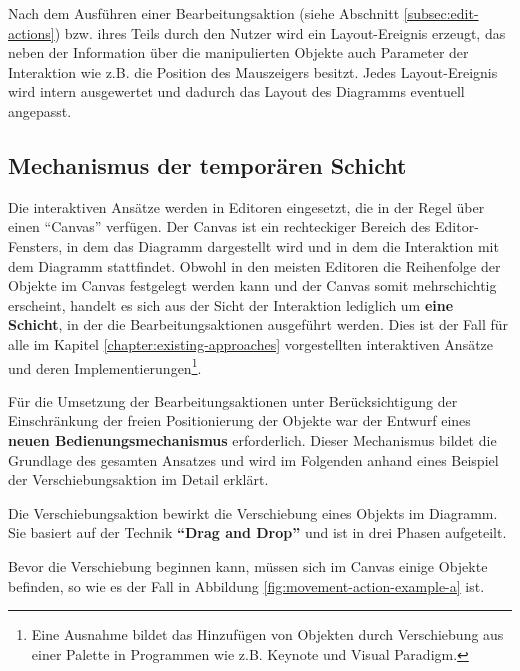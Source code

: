 Nach dem Ausführen einer Bearbeitungsaktion (siehe Abschnitt \ref{subsec:edit-actions}) bzw. ihres Teils durch den Nutzer wird ein Layout-Ereignis erzeugt, das neben der Information über die manipulierten Objekte auch Parameter der Interaktion wie z.B. die Position des Mauszeigers besitzt. Jedes Layout-Ereignis wird intern ausgewertet und dadurch das Layout des Diagramms eventuell angepasst.

\subsection{Mechanismus der temporären Schicht}

Die interaktiven Ansätze werden in Editoren eingesetzt, die in der Regel über einen \enquote{Canvas} verfügen. Der Canvas ist ein rechteckiger Bereich des Editor-Fensters, in dem das Diagramm dargestellt wird und in dem die Interaktion mit dem Diagramm stattfindet. Obwohl in den meisten Editoren die Reihenfolge der Objekte im Canvas festgelegt werden kann und der Canvas somit mehrschichtig erscheint, handelt es sich aus der Sicht der Interaktion lediglich um \textbf{eine Schicht}, in der die Bearbeitungsaktionen ausgeführt werden. Dies ist der Fall für alle im Kapitel \ref{chapter:existing-approaches} vorgestellten interaktiven Ansätze und deren Implementierungen\footnote{Eine Ausnahme bildet das Hinzufügen von Objekten durch Verschiebung aus einer Palette in Programmen wie z.B. Keynote und Visual Paradigm.}.

Für die Umsetzung der Bearbeitungsaktionen unter Berücksichtigung der Einschränkung der freien Positionierung der Objekte war der Entwurf eines \textbf{neuen Bedienungsmechanismus} erforderlich. Dieser Mechanismus bildet die Grundlage des gesamten Ansatzes und wird im Folgenden anhand eines Beispiel der Verschiebungsaktion im Detail erklärt.

Die Verschiebungsaktion bewirkt die Verschiebung eines Objekts im Diagramm. Sie basiert auf der Technik \textbf{\enquote{Drag and Drop}} und ist in drei Phasen aufgeteilt.

Bevor die Verschiebung beginnen kann, müssen sich im Canvas einige Objekte befinden, so wie es der Fall in Abbildung \ref{fig:movement-action-example-a} ist.

